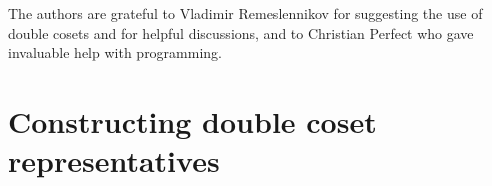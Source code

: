 \documentclass[a4paper,12pt]{article}
\numberwithin{equation}{section}
\numberwithin{figure}{section}
\newcommand{\FF}{\ensuremath{\mathbb{F}}}
\newcommand{\la}{\langle}
\newcommand{\ra}{\rangle}
\newcommand{\be}{\begin{enumerate}}
\newcommand{\ee}{\end{enumerate}}
\begin{document}
The authors are grateful to Vladimir Remeslennikov for suggesting the use of double 
cosets and
for helpful
discussions,  and to Christian Perfect who gave invaluable help with programming.

\section{Constructing double coset representatives}\label{sec:dcforms}
\end{document}
